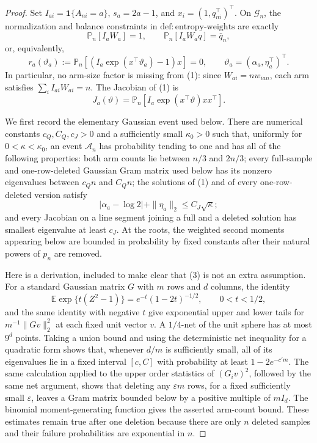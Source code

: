 \documentclass{article}
\begin{document}
\begin{proof}
Set \(I_{ai}=\mathbf 1\{A_{ni}=a\}\), \(s_a=2a-1\), and \(x_i=(1,q_{ni}^{\top})^{\top}\).  On \(\mathcal G_n\), the normalization and balance constraints in \(\mathrm{def{:}entropy\mbox{-}weights}\) are exactly
\[
 \mathbb P_n[I_aW_a]=1,
 \qquad
 \mathbb P_n[I_aW_aq]=\bar q_n,
\]
or, equivalently,
\[
 r_a(\vartheta_a):=
 \mathbb P_n[(I_a\exp(x^{\top}\vartheta_a)-1)x]=0,
 \qquad
 \vartheta_a=(\alpha_a,\eta_a^{\top})^{\top}.
 \tag{1}
\]
In particular, no arm-size factor is missing from (1): since \(W_{ai}=nw_{ian}\), each arm satisfies \(\sum_i I_{ai}W_{ai}=n\).  The Jacobian of (1) is
\[
 J_a(\vartheta)=\mathbb P_n[I_a\exp(x^{\top}\vartheta)xx^{\top}].
 \tag{2}
\]

We first record the elementary Gaussian event used below.  There are numerical constants \(c_Q,C_Q,c_J>0\) and a sufficiently small \(\kappa_0>0\) such that, uniformly for \(0<\kappa<\kappa_0\), an event \(\mathcal A_n\) has probability tending to one and has all of the following properties: both arm counts lie between \(n/3\) and \(2n/3\); every full-sample and one-row-deleted Gaussian Gram matrix used below has its nonzero eigenvalues between \(c_Qn\) and \(C_Qn\); the solutions of (1) and of every one-row-deleted version satisfy
\[
 |\alpha_a-\log 2|+\|\eta_a\|_2\le C_J\sqrt\kappa;
 \tag{3}
\]
and every Jacobian on a line segment joining a full and a deleted solution has smallest eigenvalue at least \(c_J\).  At the roots, the weighted second moments appearing below are bounded in probability by fixed constants after their natural powers of \(p_n\) are removed.

Here is a derivation, included to make clear that (3) is not an extra assumption.  For a standard Gaussian matrix \(G\) with \(m\) rows and \(d\) columns, the identity
\[
 \mathbb E\exp\{t(Z^2-1)\}=e^{-t}(1-2t)^{-1/2},
 \qquad 0<t<1/2,
\]
and the same identity with negative \(t\) give exponential upper and lower tails for \(m^{-1}\|Gv\|_2^2\) at each fixed unit vector \(v\).  A \(1/4\)-net of the unit sphere has at most \(9^d\) points.  Taking a union bound and using the deterministic net inequality for a quadratic form shows that, whenever \(d/m\) is sufficiently small, all of its eigenvalues lie in a fixed interval \([c,C]\) with probability at least \(1-2e^{-c'm}\).  The same calculation applied to the upper order statistics of \((G_iv)^2\), followed by the same net argument, shows that deleting any \(\varepsilon m\) rows, for a fixed sufficiently small \(\varepsilon\), leaves a Gram matrix bounded below by a positive multiple of \(mI_d\).  The binomial moment-generating function gives the asserted arm-count bound.  These estimates remain true after one deletion because there are only \(n\) deleted samples and their failure probabilities are exponential in \(n\).


\end{proof}
\end{document}
